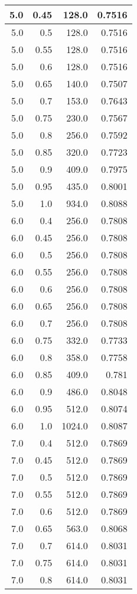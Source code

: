 \begin{center}
\begin{longtable}{|r|r|r|r|}
\hline
5.0 & 0.45 & 128.0 & 0.7516 \\
\hline
5.0 & 0.5 & 128.0 & 0.7516 \\
\hline
5.0 & 0.55 & 128.0 & 0.7516 \\
\hline
5.0 & 0.6 & 128.0 & 0.7516 \\
\hline
5.0 & 0.65 & 140.0 & 0.7507 \\
\hline
5.0 & 0.7 & 153.0 & 0.7643 \\
\hline
5.0 & 0.75 & 230.0 & 0.7567 \\
\hline
5.0 & 0.8 & 256.0 & 0.7592 \\
\hline
5.0 & 0.85 & 320.0 & 0.7723 \\
\hline
5.0 & 0.9 & 409.0 & 0.7975 \\
\hline
5.0 & 0.95 & 435.0 & 0.8001 \\
\hline
5.0 & 1.0 & 934.0 & 0.8088 \\
\hline
6.0 & 0.4 & 256.0 & 0.7808 \\
\hline
6.0 & 0.45 & 256.0 & 0.7808 \\
\hline
6.0 & 0.5 & 256.0 & 0.7808 \\
\hline
6.0 & 0.55 & 256.0 & 0.7808 \\
\hline
6.0 & 0.6 & 256.0 & 0.7808 \\
\hline
6.0 & 0.65 & 256.0 & 0.7808 \\
\hline
6.0 & 0.7 & 256.0 & 0.7808 \\
\hline
6.0 & 0.75 & 332.0 & 0.7733 \\
\hline
6.0 & 0.8 & 358.0 & 0.7758 \\
\hline
6.0 & 0.85 & 409.0 & 0.781 \\
\hline
6.0 & 0.9 & 486.0 & 0.8048 \\
\hline
6.0 & 0.95 & 512.0 & 0.8074 \\
\hline
6.0 & 1.0 & 1024.0 & 0.8087 \\
\hline
7.0 & 0.4 & 512.0 & 0.7869 \\
\hline
7.0 & 0.45 & 512.0 & 0.7869 \\
\hline
7.0 & 0.5 & 512.0 & 0.7869 \\
\hline
7.0 & 0.55 & 512.0 & 0.7869 \\
\hline
7.0 & 0.6 & 512.0 & 0.7869 \\
\hline
7.0 & 0.65 & 563.0 & 0.8068 \\
\hline
7.0 & 0.7 & 614.0 & 0.8031 \\
\hline
7.0 & 0.75 & 614.0 & 0.8031 \\
\hline
7.0 & 0.8 & 614.0 & 0.8031 \\

\end{longtable}
\end{center}
